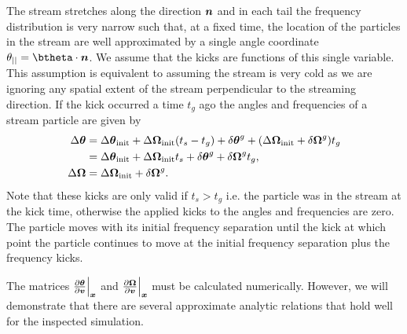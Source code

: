 \documentclass[useAMS,usenatbib,fleqn,a4paper]{mn2e}
\newcommand{\bs}[1]{\bmath{#1}}
\begin{document}
The stream stretches along the direction $\bs{n}$ and in each tail the frequency distribution is very narrow such that, at a fixed time, the location of the particles in the stream are well approximated by a single angle coordinate $\theta_{||}=\btheta\cdot\bs{n}$. We assume that the kicks are functions of this single variable. This assumption is equivalent to assuming the stream is very cold as we are ignoring any spatial extent of the stream perpendicular to the streaming direction. If the kick occurred a time $t_g$ ago the angles and frequencies of a stream particle are given by
\begin{equation}\label{linearkickevol}
\begin{split}
\Delta\bs{\theta} &= \Delta\bs{\theta}_{\rm init}+\Delta\boldsymbol{\Omega}_{\rm init}(t_s-t_g)+\delta\bs{\theta}^g+(\Delta\boldsymbol{\Omega}_{\rm init}+\delta\boldsymbol{\Omega}^g)t_g \\&= \Delta\bs{\theta}_{\rm init}+\Delta\boldsymbol{\Omega}_{\rm init}t_s+\delta\bs{\theta}^g+\delta\boldsymbol{\Omega}^g t_g,\\
\Delta\boldsymbol{\Omega} &= \Delta\boldsymbol{\Omega}_{\rm init}+\delta\boldsymbol{\Omega}^g.
\end{split}
\end{equation}
Note that these kicks are only valid if $t_s>t_g$ i.e. the particle was in the stream at the kick time, otherwise the applied kicks to the angles and frequencies are zero.
The particle moves with its initial frequency separation until the kick at which point the particle continues to move at the initial frequency separation plus the frequency kicks.

The matrices $\frac{\upartial \bs{\theta}}{\upartial \bs{v}}\Big|_{\bs{x}}$ and $\frac{\upartial \bs{\Omega}}{\upartial \bs{v}}\Big|_{\bs{x}}$ must be calculated numerically. However, we will demonstrate that there are several approximate analytic relations that hold well for the inspected simulation.
\end{document}
